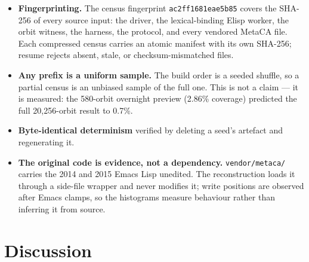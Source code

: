 \documentclass[man,12pt,floatsintext]{apa7}
\newif\ifdraftnotes
\newcommand{\owed}[1]{\ifdraftnotes\textcolor{owedcol}{\small\textbf{[OWED:} #1\textbf{]}}\fi}
\begin{document}
\begin{itemize}
  \item \textbf{Fingerprinting.} The census fingerprint
  \texttt{ac2ff1681eae5b85} covers the SHA-256 of every source input: the
  driver, the lexical-binding Elisp worker, the orbit witness, the harness,
  the protocol, and every vendored MetaCA file. Each compressed census
  carries an atomic manifest with its own SHA-256; resume rejects absent,
  stale, or checksum-mismatched files.

  \item \textbf{Any prefix is a uniform sample.} The build order is a
  seeded shuffle, so a partial census is an unbiased sample of the full
  one. This is not a claim --- it is measured: the 580-orbit overnight
  preview (2.86\% coverage) predicted the full 20{,}256-orbit result to
  0.7\%.

  \item \textbf{Byte-identical determinism} verified by deleting a seed's
  artefact and regenerating it.

  \item \textbf{The original code is evidence, not a dependency.}
  \texttt{vendor/metaca/} carries the 2014 and 2015 Emacs Lisp unedited.
  The reconstruction loads it through a side-file wrapper and never
  modifies it; write positions are observed after Emacs clamps, so the
  histograms measure behaviour rather than inferring it from source.
\end{itemize}

\section{Discussion}

\owed{Not written. Sketch of what belongs here:
(i) what the propagator family \emph{is} good for, if not for
edge-of-chaos measurement --- the curvature result suggests it is a search
space with a usable local signal;
(ii) the reconstruction-as-method argument: a twelve-year-old bug was
recoverable, correctable, and generative, which says something about
keeping code as evidence;
(iii) the honest limits (three seeds, width 60, no blob control on the
Euclidean sweep);
(iv) what would change our mind --- what a real edge-of-chaos instrument
would have to look like given Culik \& Yu, and why we think the answer is
``it would have to be a construction, like Cook's, not a statistic''.}
\end{document}
